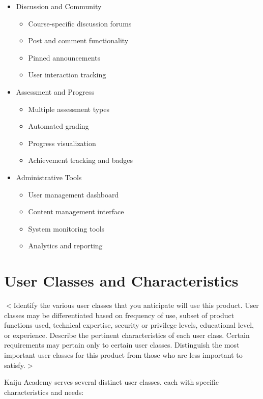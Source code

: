\documentclass[a4paper, 11pt]{scrreprt}
\begin{document}
\begin{itemize}
    \item Discussion and Community
        \begin{itemize}
            \item Course-specific discussion forums
            \item Post and comment functionality
            \item Pinned announcements
            \item User interaction tracking
        \end{itemize}
    
    \item Assessment and Progress
        \begin{itemize}
            \item Multiple assessment types
            \item Automated grading
            \item Progress visualization
            \item Achievement tracking and badges
        \end{itemize}
    
    \item Administrative Tools
        \begin{itemize}
            \item User management dashboard
            \item Content management interface
            \item System monitoring tools
            \item Analytics and reporting
        \end{itemize}
\end{itemize}

\section{User Classes and Characteristics}
$<$Identify the various user classes that you anticipate will use this product.  
User classes may be differentiated based on frequency of use, subset of product 
functions used, technical expertise, security or privilege levels, educational 
level, or experience. Describe the pertinent characteristics of each user class.  
Certain requirements may pertain only to certain user classes. Distinguish the 
most important user classes for this product from those who are less important 
to satisfy.$>$

Kaiju Academy serves several distinct user classes, each with specific characteristics and needs:
\end{document}
